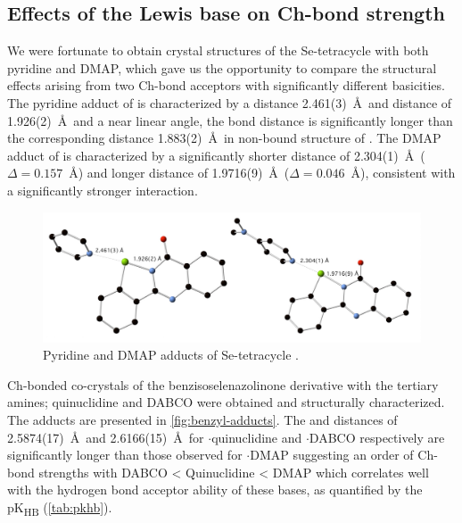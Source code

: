 \begin{refsection}
    \subsection{Effects of the Lewis base on Ch-bond strength}
    We were fortunate to obtain crystal structures of the Se-tetracycle  with both pyridine and DMAP, which gave us the opportunity to compare the structural effects arising from two Ch-bond acceptors with significantly different basicities.
    The pyridine adduct of  is characterized by a  distance 2.461(3)~\AA\ and  distance of 1.926(2)~\AA\ and a near linear  angle, the  bond distance is significantly longer than the corresponding distance 1.883(2)~\AA\ in non-bound structure of .
    The DMAP adduct of  is characterized by a significantly shorter  distance of 2.304(1)~\AA\ ($ \Delta = 0.157$~\AA) and longer  distance of 1.9716(9)~\AA\ ($ \Delta = 0.046$~\AA), consistent with a significantly stronger interaction.
    
    \begin{figure}
      \centering
      \includegraphics[width=0.8\linewidth]{Figures/dimer-dmap-py-xray.pdf}
      \caption{Pyridine and DMAP adducts of Se-tetracycle .}\label{fig:dimer-adducts}
    \end{figure}
    
    Ch-bonded co-crystals of the benzisoselenazolinone derivative  with the tertiary amines; quinuclidine and DABCO were obtained and structurally characterized.
    The adducts are presented in \cref{fig:benzyl-adducts}.
    The  and  distances of 2.5874(17)~\AA\ and 2.6166(15)~\AA\ for $ \cdot $quinuclidine and $ \cdot $DABCO respectively are significantly longer than those observed for $ \cdot $DMAP suggesting an order of Ch-bond strengths with  DABCO < Quinuclidine < DMAP which correlates well with the hydrogen bond acceptor ability of these bases, as quantified by the pK\textsubscript{HB} (\cref{tab:pkhb}).
    

\end{refsection}
